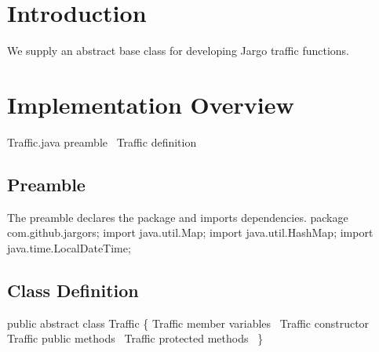 \section{Introduction}
\label{sec:introduction}
We supply an abstract base class for developing Jargo traffic functions.

\section{Implementation Overview}
\endmoddef{}
\LA{}Traffic.java preamble~{\nwtagstyle{}}\RA{}
\LA{}\code{}Traffic\edoc{} definition~{\nwtagstyle{}}\RA{}
\nwendcode{}\nwdocspar

\subsection{Preamble}
The preamble declares the package and imports dependencies.
\nwenddocs{}\endmoddef{}
package com.github.jargors;
import java.util.Map;
import java.util.HashMap;
import java.time.LocalDateTime;
\nwendcode{}\nwdocspar

\subsection{Class Definition}
\nwenddocs{}\endmoddef{}
public abstract class Traffic \{
  \LA{}\code{}Traffic\edoc{} member variables~{\nwtagstyle{}}\RA{}
  \LA{}\code{}Traffic\edoc{} constructor~{\nwtagstyle{}}\RA{}
  \LA{}\code{}Traffic\edoc{} public methods~{\nwtagstyle{}}\RA{}
  \LA{}\code{}Traffic\edoc{} protected methods~{\nwtagstyle{}}\RA{}
\}
\nwendcode{}\nwdocspar

